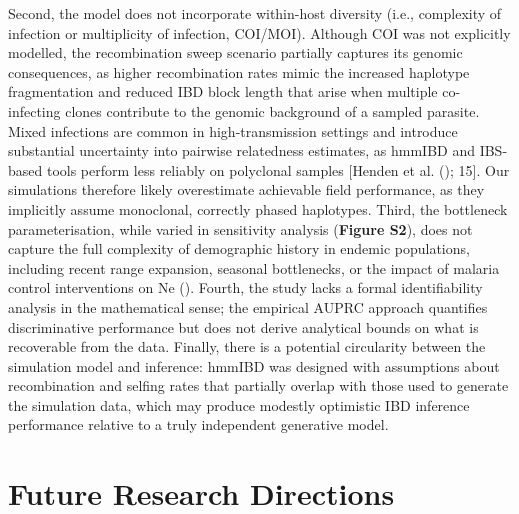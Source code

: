 \documentclass[
  11pt,
]{article}
\begin{document}
Second, the model does not incorporate within-host diversity (i.e.,
complexity of infection or multiplicity of infection, COI/MOI). Although
COI was not explicitly modelled, the recombination sweep scenario
partially captures its genomic consequences, as higher recombination
rates mimic the increased haplotype fragmentation and reduced IBD block
length that arise when multiple co-infecting clones contribute to the
genomic background of a sampled parasite. Mixed infections are common in
high-transmission settings and introduce substantial uncertainty into
pairwise relatedness estimates, as hmmIBD and IBS-based tools perform
less reliably on polyclonal samples {[}Henden et al.
(); 15{]}. Our simulations therefore
likely overestimate achievable field performance, as they implicitly
assume monoclonal, correctly phased haplotypes. Third, the bottleneck
parameterisation, while varied in sensitivity analysis (\textbf{Figure
S2}), does not capture the full complexity of demographic history in
endemic populations, including recent range expansion, seasonal
bottlenecks, or the impact of malaria control interventions on Ne
(). Fourth, the
study lacks a formal identifiability analysis in the mathematical sense;
the empirical AUPRC approach quantifies discriminative performance but
does not derive analytical bounds on what is recoverable from the data.
Finally, there is a potential circularity between the simulation model
and inference: hmmIBD was designed with assumptions about recombination
and selfing rates that partially overlap with those used to generate the
simulation data, which may produce modestly optimistic IBD inference
performance relative to a truly independent generative model.

\section{Future Research Directions}\label{future-research-directions}
\end{document}
